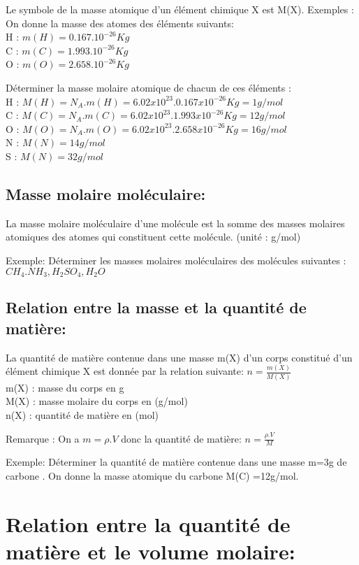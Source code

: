 \documentclass[12pt]{article}
\begin{document}
Le symbole de la masse atomique d’un élément chimique X est M(X).
Exemples : On donne la masse des atomes des éléments suivants:
\\H : $m(H) = 0.167.10^{-26}Kg$
\\C : $m(C) = 1.993.10^{-26}Kg$
\\O : $m(O) = 2.658.10^{-26}Kg$

Déterminer la masse molaire atomique de chacun de ces éléments :
\\H : $ M(H)= N_A.m(H) =6.02x10^{23} . 0.167x10^{-26}Kg = 1g/mol$
\\C : $ M(C)= N_A.m(C) =6.02x10^{23} . 1.993x10^{-26}Kg = 12g/mol$
\\O : $ M(O)= N_A.m(O) =6.02x10^{23} . 2.658x10^{-26}Kg = 16g/mol$
\\N : $M(N) =14g/mol $
\\S : $M(N) =32g/mol $
\subsection{Masse molaire moléculaire: }
La masse molaire moléculaire d'une molécule est la somme des masses molaires atomiques des atomes qui
constituent cette molécule. (unité : g/mol)

Exemple: Déterminer les masses molaires moléculaires des molécules suivantes : $CH_4 . NH_3 , H_2SO_4 , H_2O$ 

\subsection{Relation entre la masse et la quantité de matière: }
La quantité de matière contenue dans une masse m(X) d'un corps constitué d'un élément chimique X est donnée par
la relation suivante: $n = \frac{m(X)}{M(X)}$
\\m(X) : masse du corps en g
\\M(X) : masse molaire du corps en (g/mol)
\\n(X) : quantité de matière en (mol)

Remarque : On a $m = \rho.V $ donc la quantité de matière: $n = \frac{\rho.V}{M}$

Exemple: Déterminer la quantité de matière contenue dans une masse m=3g de carbone .
On donne la masse atomique du carbone M(C) =12g/mol.

\section{Relation entre la quantité de matière et le volume molaire:}
\end{document}
